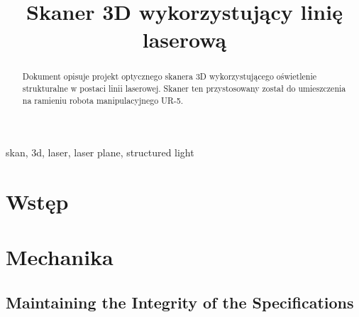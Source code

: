 \documentclass[conference]{IEEEtran}
\begin{document}
\title{Skaner 3D wykorzystujący linię laserową\\}


\author{
\and
{}
\and
{}

}

\maketitle

\begin{abstract}
Dokument opisuje projekt optycznego skanera 3D wykorzystującego oświetlenie strukturalne w postaci linii laserowej. Skaner ten przystosowany został do umieszczenia na ramieniu robota manipulacyjnego UR-5.

\end{abstract}

\begin{IEEEkeywords}
skan, 3d, laser, laser plane, structured light
\end{IEEEkeywords}

\section{Wstęp}


\section{Mechanika}

\subsection{Maintaining the Integrity of the Specifications}
\end{document}
